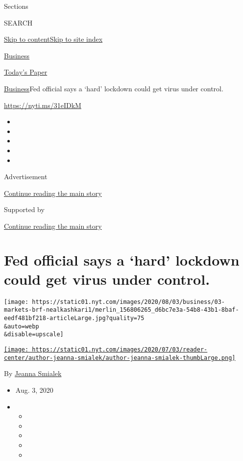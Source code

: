 Sections

SEARCH

\protect\hyperlink{site-content}{Skip to
content}\protect\hyperlink{site-index}{Skip to site index}

\href{https://www.nytimes.com/section/business}{Business}

\href{https://myaccount.nytimes.com/auth/login?response_type=cookie\&client_id=vi}{}

\href{https://www.nytimes.com/section/todayspaper}{Today's Paper}

\href{/section/business}{Business}\textbar{}Fed official says a `hard'
lockdown could get virus under control.

\url{https://nyti.ms/31eIDkM}

\begin{itemize}
\item
\item
\item
\item
\item
\end{itemize}

Advertisement

\protect\hyperlink{after-top}{Continue reading the main story}

Supported by

\protect\hyperlink{after-sponsor}{Continue reading the main story}

\hypertarget{fed-official-says-a-hard-lockdown-could-get-virus-under-control}{%
\section{Fed official says a `hard' lockdown could get virus under
control.}\label{fed-official-says-a-hard-lockdown-could-get-virus-under-control}}

\texttt{[image: https://static01.nyt.com/images/2020/08/03/business/03-markets-brf-nealkashkari1/merlin\_156806265\_d6bc7e3a-54b8-43b1-8baf-eedf481bf218-articleLarge.jpg?quality=75\\\&auto=webp\\\&disable=upscale]}

\href{https://www.nytimes.com/by/jeanna-smialek}{\texttt{[image: https://static01.nyt.com/images/2020/07/03/reader-center/author-jeanna-smialek/author-jeanna-smialek-thumbLarge.png]}}

By \href{https://www.nytimes.com/by/jeanna-smialek}{Jeanna Smialek}

\begin{itemize}
\item
  Aug. 3, 2020
\item
  \begin{itemize}
  \item
  \item
  \item
  \item
  \item
  \end{itemize}
\end{itemize}

